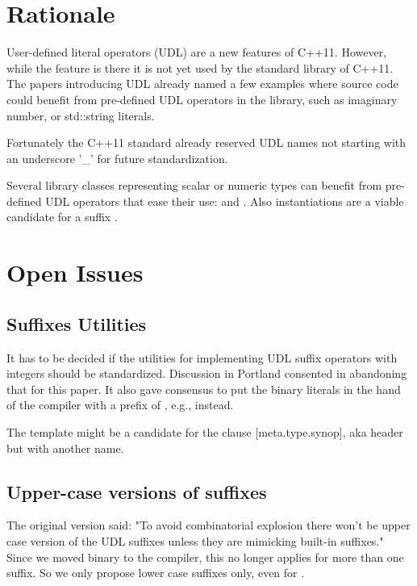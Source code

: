 \documentclass[ebook,11pt,article]{memoir}
\begin{document}
\section{Rationale}
User-defined literal operators (UDL) are a new features of C++11. However, while the feature is there it is not yet used by the standard library of C++11. The papers introducing UDL already named a few examples where source code could benefit from pre-defined UDL operators in the library, such as imaginary number, or std::string literals.

Fortunately the C++11 standard already reserved UDL names not starting with an underscore '_' for future standardization. 

Several library classes representing scalar or numeric types can benefit from pre-defined UDL operators that ease their use:  and . Also  instantiations are a viable candidate for a suffix .

\section{Open Issues}
\subsection{Suffixes Utilities}
It has to be decided if the utilities for implementing UDL suffix operators with integers should be standardized.
Discussion in Portland consented in abandoning that for this paper. It also gave consensus to put the binary literals in the hand of the compiler with a prefix of , e.g.,  instead.

The template  might be a candidate for the clause [meta.type.synop], aka header  but with another name.

\subsection{Upper-case versions of suffixes}

The original version said: "To avoid combinatorial explosion there won't be upper case version of the UDL suffixes unless they are mimicking built-in suffixes." Since we moved binary to the compiler, this no longer applies for more than one suffix. So we only propose lower case suffixes only, even for .
\end{document}
